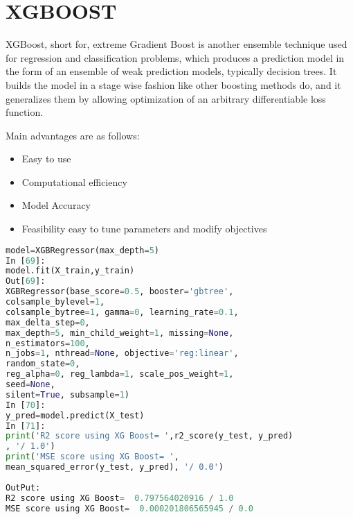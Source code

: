\section{XGBOOST}

XGBoost, short for, extreme Gradient Boost is another ensemble technique used for regression and classification problems, which produces a prediction model in the form of an ensemble of weak prediction models, typically decision trees. It builds the model in a stage wise fashion like other boosting methods do, and it generalizes them by allowing optimization of an arbitrary differentiable loss function.\cite{xia:2020} \bigskip

Main advantages are as follows:
\begin{itemize}
\item Easy to use
\item Computational efficiency
\item Model Accuracy
\item Feasibility easy to tune parameters and modify objectives
\end{itemize}
\begin{lstlisting}[language=Python]
model=XGBRegressor(max_depth=5)
In [69]:
model.fit(X_train,y_train)
Out[69]:
XGBRegressor(base_score=0.5, booster='gbtree', 
colsample_bylevel=1,
colsample_bytree=1, gamma=0, learning_rate=0.1, 
max_delta_step=0,
max_depth=5, min_child_weight=1, missing=None, 
n_estimators=100,
n_jobs=1, nthread=None, objective='reg:linear', 
random_state=0,
reg_alpha=0, reg_lambda=1, scale_pos_weight=1, 
seed=None,
silent=True, subsample=1)
In [70]:
y_pred=model.predict(X_test)
In [71]:
print('R2 score using XG Boost= ',r2_score(y_test, y_pred)
, '/ 1.0')
print('MSE score using XG Boost= ',
mean_squared_error(y_test, y_pred), '/ 0.0')
	
OutPut:
R2 score using XG Boost=  0.797564020916 / 1.0
MSE score using XG Boost=  0.000201806565945 / 0.0
	
\end{lstlisting}


